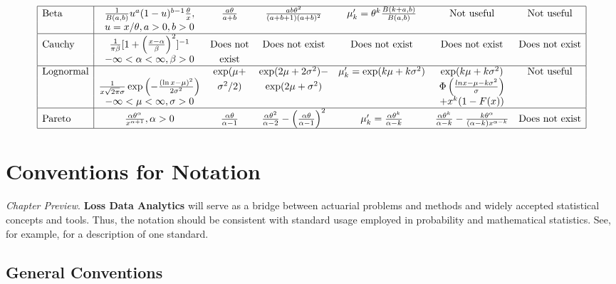 \documentclass[]{book}
\theoremstyle{definition}
\theoremstyle{definition}
\theoremstyle{definition}
\theoremstyle{remark}
\begin{document}
\[{\begin{matrix}
\begin{array}{|l|cccccc|}
\hline
      \text{Beta} & \frac{1}{B(a,b)} u^a(1-u)^{b-1}\frac{\theta}{x}, & \frac{a \theta}{a+b} & \frac{ab\theta^2}{(a+b+1)(a+b)^2} & \mu_k'=\theta^k \frac{B(k+a,b)}{B(a,b)} & \text{Not useful} & \text{Not useful} \\
           & u=x/\theta ,  a>0 , b>0 & & & &            &            \\
\hline
    \text{Cauchy} & \frac{1}{\pi\beta}[1+\left( \frac{x-\alpha}{\beta}\right)^2]^{-1} &   \text{Does not} & \text{Does not exist} & \text{Does not exist} & \text{Does not exist} & \text{Does not exist} \\
           & -\infty <\alpha <\infty, \beta>0 &      \text{exist} &            &            &            &            \\
\hline
 \text{Lognormal} &    & \exp(\mu+ & \exp(2\mu +2\sigma^2)- & \mu_k'=\exp(k\mu+k\sigma^2) & \exp(k\mu+k\sigma^2) & \text{Not useful} \\
           & \frac{1}{x\sqrt{2\pi}\sigma}\exp\left( -\frac{(\ln x-\mu)^2}{2\sigma^2}\right)  & \sigma^2/2) & \exp(2\mu+\sigma^2) & & \Phi\left( \frac{lnx-\mu-k\sigma^2}{\sigma}\right) &            \\
           & -\infty <\mu <\infty, \sigma>0 &            &            &            & +x^k(1-F(x)) &            \\
\hline
    \text{Pareto} & \frac{\alpha \theta^{\alpha}}{x^{\alpha+1}}, \alpha>0 & \frac{\alpha\theta}{\alpha-1} & \frac{\alpha\theta^2}{\alpha-2}-\left( \frac{\alpha \theta}{\alpha-1}\right)^2 & \mu_k'=\frac{\alpha\theta^k}{\alpha-k} & \frac{\alpha\theta^k}{\alpha-k}-\frac{k\theta^{\alpha}}{(\alpha-k)x^{\alpha-k}} & \text{Does not exist} \\
\hline
\end{array}
\end{matrix}
}
\]

\chapter{Conventions for Notation}\label{S:NotationConvention}

\emph{Chapter Preview}. \textbf{Loss Data Analytics} will serve as a
bridge between actuarial problems and methods and widely accepted
statistical concepts and tools. Thus, the notation should be consistent
with standard usage employed in probability and mathematical statistics.
See, for example, \citep{halperin1965recommended} for a description of
one standard.

\section{General Conventions}\label{S:General}
\end{document}
